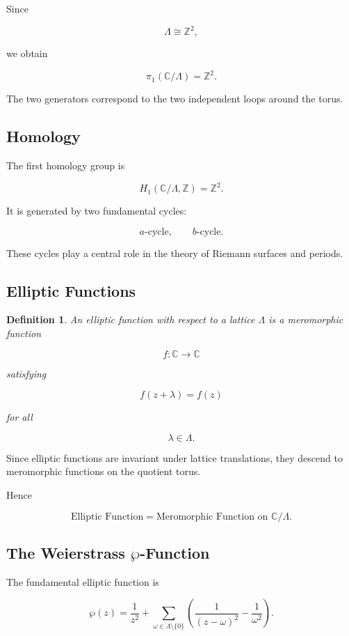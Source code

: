 \documentclass[12pt,a4paper]{article}
\theoremstyle{notespace}
\newtheorem{definition}{Definition}[subsection]
\begin{document}
Since

\[
\Lambda\cong\mathbb Z^2,
\]

we obtain

\[
\boxed{
	\pi_1(\mathbb C/\Lambda)
	=
	\mathbb Z^2.
}
\]

The two generators correspond to the two independent loops around the torus.

\subsection{Homology}

The first homology group is

\[
H_1(\mathbb C/\Lambda,\mathbb Z)
=
\mathbb Z^2.
\]

It is generated by two fundamental cycles:

\[
a\text{-cycle},
\qquad
b\text{-cycle}.
\]

These cycles play a central role in the theory of Riemann surfaces and periods.

\subsection{Elliptic Functions}

\begin{definition}
	An elliptic function with respect to a lattice \(\Lambda\) is a meromorphic function
	
	\[
	f:\mathbb C\to\mathbb C
	\]
	
	satisfying
	
	\[
	f(z+\lambda)=f(z)
	\]
	
	for all
	
	\[
	\lambda\in\Lambda.
	\]
\end{definition}

Since elliptic functions are invariant under lattice translations, they descend to meromorphic functions on the quotient torus.

Hence

\[
\boxed{
	\text{Elliptic Function}
	=
	\text{Meromorphic Function on }
	\mathbb C/\Lambda.
}
\]

\subsection{The Weierstrass \(\wp\)-Function}

The fundamental elliptic function is

\[
\wp(z)
=
\frac1{z^2}
+
\sum_{\omega\in\Lambda\setminus\{0\}}
\left(
\frac1{(z-\omega)^2}
-
\frac1{\omega^2}
\right).
\]
\end{document}
